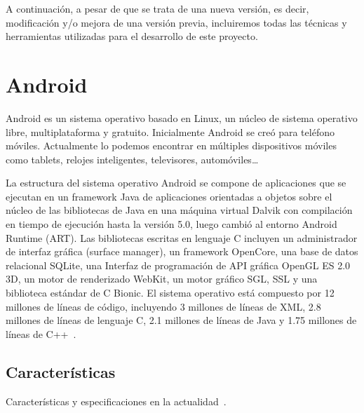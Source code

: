 A continuación, a pesar de que se trata de una nueva versión, es decir, modificación y/o mejora de una versión previa, incluiremos todas las técnicas y herramientas utilizadas para el desarrollo de este proyecto.
\section{Android}
Android es un sistema operativo basado en Linux, un núcleo de sistema operativo libre, multiplataforma y gratuito.
Inicialmente Android se creó para teléfono móviles. Actualmente lo podemos encontrar en múltiples dispositivos móviles como tablets, relojes inteligentes, televisores, automóviles…

La estructura del sistema operativo Android se compone de aplicaciones que se ejecutan en un framework Java de aplicaciones orientadas a objetos sobre el núcleo de las bibliotecas de Java en una máquina virtual Dalvik con compilación en tiempo de ejecución hasta la versión 5.0, luego cambió al entorno Android Runtime (ART).
Las bibliotecas escritas en lenguaje C incluyen un administrador de interfaz gráfica (surface manager), un framework OpenCore, una base de datos relacional SQLite, una Interfaz de programación de API gráfica OpenGL ES 2.0 3D, un motor de renderizado WebKit, un motor gráfico SGL, SSL y una biblioteca estándar de C Bionic. El sistema operativo está compuesto por 12 millones de líneas de código, incluyendo 3 millones de líneas de XML, 2.8 millones de líneas de lenguaje C, 2.1 millones de líneas de Java y 1.75 millones de líneas de C++~\cite{wiki:android}.

\subsection{Características}
Características y especificaciones en la actualidad~\cite{wiki:android}.

